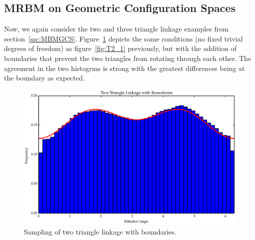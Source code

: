 \subsection{MRBM on Geometric Configuration Spaces}
Now, we again consider the two and three triangle linkage examples from section~\ref{ssc:MBMGCS}. Figure~\ref{fig:T2_2} depicts the same conditions (no fixed trivial degrees of freedom) as figure~\ref{fig:T2_1} previously, but with the addition of boundaries that prevent the two triangles from rotating through each other. The agreement in the two histogrms is strong with the greatest differences being at the boundary as expected. 
\begin{figure}[ht]
\label{fig:T2_2}
\centering
  \includegraphics[scale=0.6]{images/T2_2.eps}
\caption{Sampling of two triangle linkage with boundaries.}
\end{figure}

